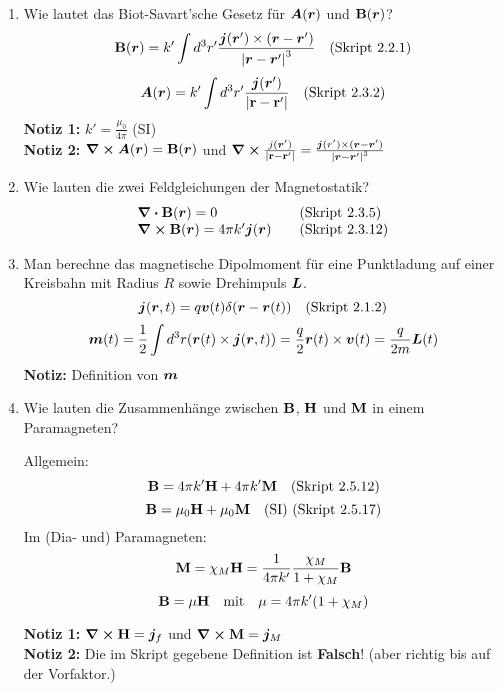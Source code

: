 \begin{enumerate}
  \item Wie lautet das Biot-Savart'sche Gesetz für $\vb* A(\vb* r)$ und
        $\vb B(\vb* r)$?
        $$\vb B(\vb* r)=k'\int d^3r'\frac{\vb* j(\vb* r')\times
        (\vb* r-\vb* r')}{\abs{\vb* r-\vb* r'}^3}
        \quad \text{(Skript 2.2.1)}$$
        $$\vb* A(\vb* r)=k'\int d^3r'\frac{\vb* j(\vb* r')}{\abs{\vb{r}-\vb{r}'}}
        \quad \text{(Skript 2.3.2)}$$
        \textbf{Notiz 1:} $k'=\frac{\mu_0}{4\pi}$ (SI)\\
        \textbf{Notiz 2:} $\curl \vb* A(\vb* r) = \vb B(\vb* r)$ und 
        $\curl \frac{j(\vb* r')}{\abs{\vb{r}-\vb{r}'}}
        =\frac{\vb* j(r') \times (\vb* r - \vb* r')}{\abs{\vb* r - \vb* r'}^3}$

  \item Wie lauten die zwei Feldgleichungen der Magnetostatik?
    \begin{equation*}
      \begin{array}{ll}
        \div \vb B(\vb* r) = 0&\quad\text{(Skript 2.3.5)}\\
        \curl \vb B(\vb* r)= 4\pi k'\vb* j(\vb* r)&\quad\text{(Skript 2.3.12)}
      \end{array}
    \end{equation*}

  \item Man berechne das magnetische Dipolmoment für eine Punktladung auf
        einer Kreisbahn mit Radius $R$ sowie Drehimpuls $\vb* L$.
        $$\vb* j(\vb* r,t)=q\vb* v(t)\delta(\vb* r-\vb* r(t))\quad\text{(Skript 2.1.2)}$$
        $$\vb* m(t) 
        = \frac{1}{2}\int d^3 r (\vb* r(t) \times \vb* j(\vb* r,t))
        =\frac{q}{2}\vb* r(t)\times\vb* v(t)=\frac{q}{2m}\vb* L(t)$$
        \textbf{Notiz:} Definition von $\vb* m$ 

  \item Wie lauten die Zusammenhänge zwischen $\vb B$, $\vb H$ 
        und $\vb M$ in einem Paramagneten?

        Allgemein:
        $$\vb B = 4\pi k'\vb H + 4\pi k'\vb M\quad\text{(Skript 2.5.12)}$$
        $$\vb B = \mu_0 \vb H + \mu_0 \vb M \quad\text{(SI) 
        (Skript 2.5.17)}$$
        Im (Dia- und) Paramagneten:
        \begin{equation*}
            \vb M 
            = \chi_M \vb H 
            = \frac{1}{4\pi k'}\frac{\chi_M}{1+\chi_M} \vb B
        \end{equation*}
         \begin{equation*}
            \vb B = \mu \vb H \quad \text{mit}\quad
            \mu = 4\pi k'(1+\chi_M)
         \end{equation*}
          \begin{center}
          \end{center}

        \textbf{Notiz 1:} $\displaystyle \curl \vb H = \vb* j_f$ und 
        $\displaystyle \curl \vb M=\vb* j_M$\\
        \textbf{Notiz 2:} Die im Skript gegebene Definition ist 
        \textbf{Falsch}! (aber richtig bis auf der Vorfaktor.)
\end{enumerate}
